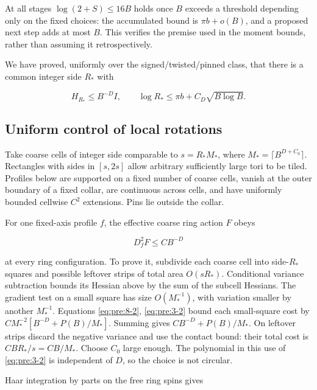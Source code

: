 At all stages \(\log(2+S)\leq16B\) holds once \(B\) exceeds a threshold depending only on the fixed choices: the accumulated bound is \(\pi b+o(B)\), and a proposed next step adds at most \(B\). This verifies the premise used in the moment bounds, rather than assuming it retrospectively.

We have proved, uniformly over the signed/twisted/pinned class, that there is a common integer side \(R_*\) with

\begin{equation}
\boxed{\ H_{R_*}\leq B^{-D}I,\qquad
\log R_*\leq\pi b+C_D\sqrt{B\log B}.\ }
\label{eq:pre:8-2}
\end{equation}


\subsection{Uniform control of local rotations}\label{pre:rotations}

Take coarse cells of integer side comparable to
\(s=R_*M_*\), where \(M_*=\lceil B^{D+C_0}\rceil\). Rectangles with sides in \([s,2s]\) allow arbitrary sufficiently large tori to be tiled. Profiles below are supported on a fixed number of coarse cells, vanish at the outer boundary of a fixed collar, are continuous across cells, and have uniformly bounded cellwise \(C^2\) extensions. Pins lie outside the collar.

For one fixed-axis profile \(f\), the effective coarse ring action \(F\) obeys

\begin{equation}
D_f^2F\leq CB^{-D}
\label{eq:pre:9-1}
\end{equation}

at every ring configuration. To prove it, subdivide each coarse cell into side-\(R_*\) squares and possible leftover strips of total area \(O(sR_*)\). Conditional variance subtraction bounds its Hessian above by the sum of the subcell Hessians. The gradient test on a small square has size \(O(M_*^{-1})\), with variation smaller by another \(M_*^{-1}\). Equations \eqref{eq:pre:8-2}, \eqref{eq:pre:3-2} bound each small-square cost by
\(CM_*^{-2}[B^{-D}+P(B)/M_*]\).
Summing gives \(CB^{-D}+P(B)/M_*\). On leftover strips discard the negative variance and use the contact bound: their total cost is \(CBR_*/s=CB/M_*\). Choose \(C_0\) large enough. The polynomial in this use of \eqref{eq:pre:3-2} is independent of \(D\), so the choice is not circular.

Haar integration by parts on the free ring spins gives


